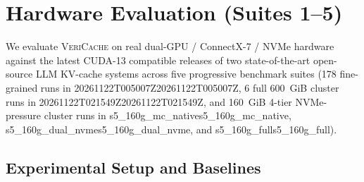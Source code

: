\documentclass[11pt,a4paper]{article}
\let\origunderscore\_
\DeclareRobustCommand{\code}[1]{{\ttfamily\ifmmode #1\else\def\_{\origunderscore\hspace{0pt}}#1\fi}}
\newcommand{\VC}{\textsc{VeriCache}}
\begin{document}
\section{Hardware Evaluation (Suites 1--5)}
\label{sec:eval}

We evaluate \VC{} on real dual-GPU / ConnectX-7 / NVMe hardware against the latest CUDA-13 compatible releases of two state-of-the-art open-source LLM KV-cache systems across five progressive benchmark suites (178 fine-grained runs in \code{20261122T005007Z}, 6 full 600~GiB cluster runs in \code{20261122T021549Z}, and 160~GiB 4-tier NVMe-pressure cluster runs in \code{s5\_160g\_mc\_native}, \code{s5\_160g\_dual\_nvme}, and \code{s5\_160g\_full}).

\subsection{Experimental Setup and Baselines}
\end{document}
